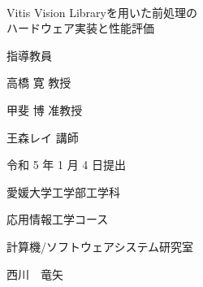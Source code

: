 \documentclass[11pt,a4j]{jreport}
\begin{document}
\thispagestyle{empty}
\begin{center}
\
\vspace{3cm}

{\huge{Vitis Vision Libraryを用いた前処理の\\
ハードウェア実装と性能評価}}

\vspace{9mm}

{\LARGE 指導教員}

\vspace{5mm}

{\LARGE 高橋 寛 教授}

\vspace{4mm}

{\LARGE 甲斐 博 准教授}

\vspace{4mm}

{\LARGE 王森レイ 講師}

\vspace{20mm}

{\LARGE 令和 5 年 1 月 4 日提出}\\

\vspace{20mm}

{\LARGE 愛媛大学工学部工学科}\\

\vspace{4mm}

{\LARGE 応用情報工学コース}\\

\vspace{4mm}

{\LARGE 計算機/ソフトウェアシステム研究室}\\

\vspace{18mm}

{\huge 西川　竜矢}\\

\end{center}

\thispagestyle{empty}
\clearpage

\tableofcontents

\pagestyle{fancy}
\lhead{\rightmark}
\renewcommand{\chaptermark}[1]{\markboth{第\ \normalfont\thechapter\ 章~~#1}{}}
%
\end{document}
